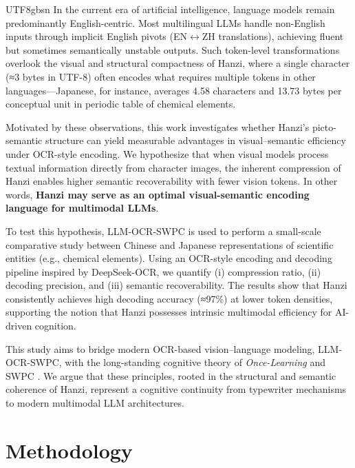 \documentclass[conference]{IEEEtran}
\begin{document}
\begin{CJK*}{UTF8}{gbsn}
In the current era of artificial intelligence, language models remain predominantly English-centric. Most multilingual LLMs handle non-English inputs through implicit English pivots (EN$\leftrightarrow$ZH translations), achieving fluent but sometimes semantically unstable outputs. Such token-level transformations overlook the visual and structural compactness of Hanzi, where a single character (≈3 bytes in UTF-8) often encodes what requires multiple tokens in other languages—Japanese, for instance, averages 4.58 characters and 13.73 bytes per conceptual unit in periodic table of chemical elements.

Motivated by these observations, this work investigates whether Hanzi’s picto-semantic structure can yield measurable advantages in visual–semantic efficiency under OCR-style encoding. We hypothesize that when visual models process textual information directly from character images, the inherent compression of Hanzi enables higher semantic recoverability with fewer vision tokens. In other words, \textbf{Hanzi may serve as an optimal visual-semantic encoding language for multimodal LLMs}.

To test this hypothesis, LLM-OCR-SWPC is used to perform a small-scale comparative study between Chinese and Japanese representations of scientific entities (e.g., chemical elements). Using an OCR-style encoding and decoding pipeline inspired by DeepSeek-OCR, we quantify (i) compression ratio, (ii) decoding precision, and (iii) semantic recoverability. The results show that Hanzi consistently achieves high decoding accuracy (≈97\%) at lower token densities, supporting the notion that Hanzi possesses intrinsic multimodal efficiency for AI-driven cognition.

This study aims to bridge modern OCR-based vision–language modeling, LLM-OCR-SWPC, with the long-standing cognitive theory of \textit{Once-Learning} \cite{weigang1999study,weigang2022hol,althoff2022once} and SWPC \cite{weigang2024six}. We argue that these principles, rooted in the structural and semantic coherence of Hanzi, represent a cognitive continuity from typewriter mechanisms to modern multimodal LLM architectures. 

\section{Methodology}
\label{sec:methodology}



\end{CJK*}
\end{document}
